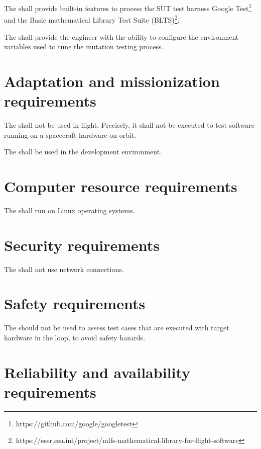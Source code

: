 \RQ{} The \FAQAS shall provide built-in features to process the SUT test harness Google Test\footnote{https://github.com/google/googletest} and the Basic mathematical Library Test Suite (BLTS)\footnote{https://essr.esa.int/project/mlfs-mathematical-library-for-flight-software}.


\RQ{} The \FAQAS shall provide the engineer with the ability to configure the environment variables used to tune the mutation testing process.



\section{Adaptation and missionization requirements}

\RQ{} The \FAQAS shall not be used in flight. Precisely, it shall not be executed to test software running on a spacecraft hardware on orbit.

\RQ{} The \FAQAS shall be used in the development environment.




\section{Computer resource requirements}


\RQ{} The \FAQAS shall run on Linux operating systems.



\section{Security requirements }

\RQ{} The \FAQAS shall not use network connections.

\section{Safety requirements}

\RQ{} The \FAQAS should not be used to assess test cases that are executed with target hardware in the loop, to avoid safety hazards.

\section{Reliability and availability requirements}

